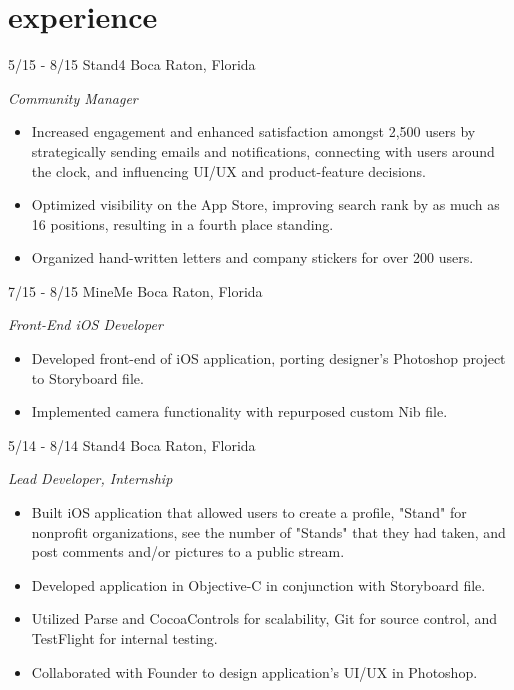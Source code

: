 \documentclass[print]{friggeri-cv}
\begin{document}
\vspace{-10pt} %

\section{experience}
\begin{entrylist}

\entry
{5/15 - 8/15}
{Stand4}
{Boca Raton, Florida}
{
\emph{Community Manager}
\begin{itemize}
	\item Increased engagement and enhanced satisfaction amongst 2,500 users by strategically sending emails and notifications, connecting with users around the clock, and influencing UI/UX and product-feature decisions. 
	\item Optimized visibility on the App Store, improving search rank by as much as 16 positions, resulting in a fourth place standing.
	\item Organized hand-written letters and company stickers for over 200 users.   
\end{itemize} 
}

\entry
{7/15 - 8/15}
{MineMe}
{Boca Raton, Florida}
{
\emph{Front-End iOS Developer}
\begin{itemize}
	\item Developed front-end of iOS application, porting designer's Photoshop project to Storyboard file.
	\item Implemented camera functionality with repurposed custom Nib file.
\end{itemize}
}

\entry
{5/14 - 8/14}
{Stand4}
{Boca Raton, Florida}
{
\emph{Lead  Developer, Internship}
\begin{itemize}
	\item Built iOS application that allowed users to create a profile, "Stand" for nonprofit organizations, see the number of "Stands" that they had taken, and post comments and/or pictures to a public stream. 
	\item Developed application in Objective-C in conjunction with Storyboard file.
	\item Utilized Parse and CocoaControls for scalability, Git for source control, and TestFlight for internal testing. 
	\item Collaborated with Founder to design application's UI/UX in Photoshop.
\end{itemize}
}


\end{entrylist}
\end{document}
